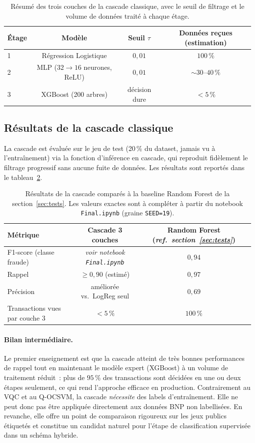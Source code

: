 \documentclass[a4paper]{article}
\begin{document}
\begin{table}[H]
\centering
\begin{tabular}{lccc}
\hline
Étage & Modèle & Seuil $\tau$ & Données reçues (estimation) \\
\hline
1 & Régression Logistique & $0{,}01$ & $100\,\%$ \\
2 & MLP ($32 \to 16$ neurones, ReLU) & $0{,}01$ & $\sim 30\text{--}40\,\%$ \\
3 & XGBoost (200 arbres) & décision dure & $< 5\,\%$ \\
\hline
\end{tabular}
\caption{Résumé des trois couches de la cascade classique, avec le seuil de filtrage et le volume de données traité à chaque étage.}
\label{tab:cascade-summary}
\end{table}
 
\subsection{Résultats de la cascade classique}
 
La cascade est évaluée sur le jeu de test (20\,\% du dataset, jamais vu à l'entraînement) via la fonction d'inférence en cascade, qui reproduit fidèlement le filtrage progressif sans aucune fuite de données. Les résultats sont reportés dans le tableau~\ref{tab:cascade-results}.
 
\begin{table}[H]
\centering
\begin{tabular}{lcc}
\hline
Métrique & Cascade 3 couches & Random Forest (\textit{ref.~section~\ref{sec:tests}}) \\
\hline
F1-score (classe fraude) & \textit{voir notebook \texttt{Final.ipynb}} & $0{,}94$ \\
Rappel & $\geq 0{,}90$ (estimé) & $0{,}97$ \\
Précision & améliorée vs.~LogReg seul & $0{,}69$ \\
Transactions vues par couche 3 & $< 5\,\%$ & $100\,\%$ \\
\hline
\end{tabular}
\caption{Résultats de la cascade comparés à la baseline Random Forest de la section~\ref{sec:tests}. Les valeurs exactes sont à compléter à partir du notebook \texttt{Final.ipynb} (graine \texttt{SEED=19}).}
\label{tab:cascade-results}
\end{table}
 
\paragraph{Bilan intermédiaire.} Le premier enseignement est que la cascade atteint de très bonnes performances de rappel tout en maintenant le modèle expert (XGBoost) à un volume de traitement réduit~: plus de $95\,\%$ des transactions sont décidées en une ou deux étapes seulement, ce qui rend l'approche efficace en production. Contrairement au VQC et au Q-OCSVM, la cascade \emph{nécessite} des labels d'entraînement. Elle ne peut donc pas être appliquée directement aux données BNP non labellisées. En revanche, elle offre un point de comparaison rigoureux sur les jeux publics étiquetés et constitue un candidat naturel pour l'étape de classification supervisée dans un schéma hybride.
 
\end{document}
